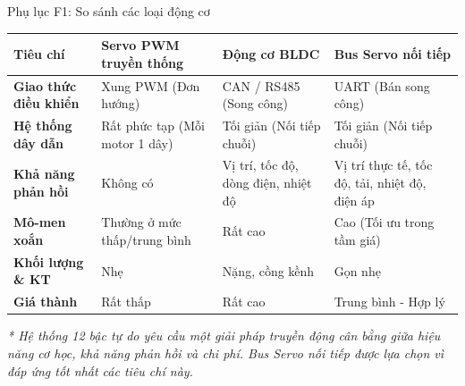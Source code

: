 \documentclass[10pt,aspectratio=169]{beamer}
\begin{document}
\begin{frame}{Phụ lục F1: So sánh các loại động cơ}
  \begin{table}[htbp]
      \centering
      \small
      \def\arraystretch{1.3}
      \begin{tabular}{p{2.5cm} p{3.5cm} p{3.5cm} p{4cm}}
          \toprule
          \textbf{Tiêu chí} & \textbf{Servo PWM truyền thống} & \textbf{Động cơ BLDC} & \textbf{Bus Servo nối tiếp} \\
          \midrule
          \textbf{Giao thức điều khiển} & Xung PWM (Đơn hướng) & CAN / RS485 (Song công) & UART (Bán song công) \\
          \textbf{Hệ thống dây dẫn} & Rất phức tạp (Mỗi motor 1 dây) & Tối giản (Nối tiếp chuỗi) & Tối giản (Nối tiếp chuỗi) \\
          \textbf{Khả năng phản hồi} & Không có & Vị trí, tốc độ, dòng điện, nhiệt độ & Vị trí thực tế, tốc độ, tải, nhiệt độ, điện áp \\
          \textbf{Mô-men xoắn} & Thường ở mức thấp/trung bình & Rất cao & Cao (Tối ưu trong tầm giá) \\
          \textbf{Khối lượng \& KT} & Nhẹ & Nặng, cồng kềnh & Gọn nhẹ \\
          \textbf{Giá thành} & Rất thấp & Rất cao & Trung bình - Hợp lý \\
          \bottomrule
      \end{tabular}
  \end{table}
  \vspace{0.1cm}
  {\small \textit{* Hệ thống 12 bậc tự do yêu cầu một giải pháp truyền động cân bằng giữa hiệu năng cơ học, khả năng phản hồi và chi phí. Bus Servo nối tiếp được lựa chọn vì đáp ứng tốt nhất các tiêu chí này.}}
\end{frame}
\end{document}
